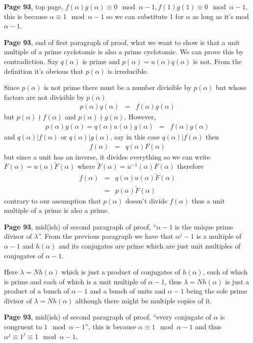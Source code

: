\documentclass[aps,preprint,preprintnumbers,nofootinbib,showpacs,prd]{revtex4-1}
\newcommand{\nbea}{\begin{eqnarray*}}
\newcommand{\neea}{\end{eqnarray*}}
\begin{document}
{\bf Page 93}, top page, $f(\alpha)g(\alpha) \equiv 0 \mod{\alpha - 1}, f(1)g(1) \equiv 0 \mod{\alpha - 1}$, this is because $\alpha \equiv 1 \mod{\alpha - 1}$ so we can substitute 1 for $\alpha$ as long as it's mod $\alpha - 1$.

{\bf Page 93}, end of first paragraph of proof, what we want to show is that a unit multiple of a prime cyclotomic is also a prime cyclotomic. We can prove this by contradiction. Say $q(\alpha)$ is prime and $p(\alpha) = u(\alpha)q(\alpha)$ is not. From the definition it's obvious that $p(\alpha)$ is irreducible.

Since $p(\alpha)$ is not prime there must be a number divisible by $p(\alpha)$ but whose factors are not divisible by $p(\alpha)$
%
\nbea
p(\alpha) y(\alpha) & = & f(\alpha) g(\alpha)
\neea
%
but $p(\alpha)\nmid f(\alpha)$ and $p(\alpha) \nmid g(\alpha)$. However,
%
\nbea
p(\alpha) y(\alpha)  = q(\alpha) u(\alpha) y(\alpha)& = & f(\alpha) g(\alpha)
\neea
%
and $q(\alpha)|f(\alpha)$ or $q(\alpha)|g(\alpha)$, say in this case $q(\alpha)|f(\alpha)$ then
%
\nbea
f(\alpha) & = & q(\alpha) F(\alpha)
\neea
%
but since a unit has an inverse, it divides everything so we can write $F(\alpha) = u(\alpha) \tilde F(\alpha)$ where $\tilde F(\alpha) = u^{-1}(\alpha) F(\alpha)$ therefore
%
\nbea
f(\alpha) & = & q(\alpha) u(\alpha)\tilde F(\alpha) \\
& = & p(\alpha) \tilde F(\alpha)
\neea
%
contrary to our assumption that $p(\alpha)$ doesn't divide $f(\alpha)$ thus a unit multiple of a prime is also a prime.

{\bf Page 93}, mid(ish) of second paragraph of proof, ``$\alpha - 1$ is the unique prime divisor of $\lambda$''. From the previous paragraph we have that $\alpha^j - 1$ is a multiple of $\alpha - 1$ and $h(\alpha)$ and its conjugates are prime which are just unit multiples of conjugates of $\alpha - 1$. 

Here $\lambda = Nh(\alpha)$ which is just a product of conjugates of $h(\alpha)$, each of which is prime and each of which is a unit multiple of $\alpha - 1$, thus $\lambda = Nh(\alpha)$ is just a product of a bunch of $\alpha - 1$ and a bunch of units and $\alpha - 1$ being the sole prime divisor of $\lambda = Nh(\alpha)$ although there might be multiple copies of it.

{\bf Page 93}, mid(ish) of second paragraph of proof, ``every conjugate of $\alpha$ is congruent to $1 \mod{\alpha - 1}$'', this is because $\alpha \equiv 1 \mod{\alpha-1}$ and thus $\alpha^j \equiv 1^j \equiv 1 \mod{\alpha-1}$.
\end{document}
